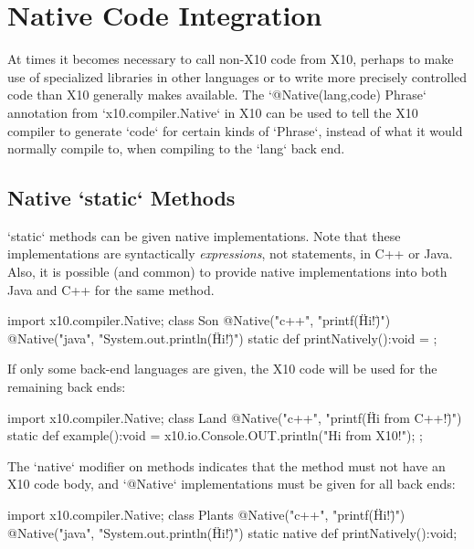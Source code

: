 \chapter{Native Code Integration}
\label{NativeCode}

At times it becomes necessary to call non-X10 code from X10, perhaps to make
use of specialized libraries in other languages or to write more precisely
controlled code than X10 generally makes available. The
\xcd`@Native(lang,code) Phrase` annotation from \xcd`x10.compiler.Native` in
X10 can be used to tell the X10 compiler to generate \xcd`code` for certain
kinds of \xcd`Phrase`, instead of what it would normally compile to, when
compiling to the \xcd`lang` back end.


\section{Native \xcd`static` Methods}

\xcd`static` methods can be given native implementations.  Note that these
implementations are syntactically {\em expressions}, not statements, in C++ or
Java.   Also, it is possible (and common) to provide native implementations
into both Java and C++ for the same method.
\begin{xten}
import x10.compiler.Native;
class Son {
  @Native("c++", "printf(\"Hi!\")")
  @Native("java", "System.out.println(\"Hi!\")")
  static def printNatively():void = {};
}
\end{xten}
%

If only some back-end languages are given, the X10 code will be used for the
remaining back ends: 
\begin{xten}
import x10.compiler.Native;
class Land {
  @Native("c++", "printf(\"Hi from C++!\")")
  static def example():void = {
    x10.io.Console.OUT.println("Hi from X10!");
  };
}
\end{xten}
%

The \xcd`native` modifier on methods indicates that the method must not have
an X10 code body, and \xcd`@Native` implementations must be given for all back
ends:
\begin{xten}
import x10.compiler.Native;
class Plants {
  @Native("c++", "printf(\"Hi!\")")
  @Native("java", "System.out.println(\"Hi!\")")
  static native def printNatively():void;
}
\end{xten}
%



